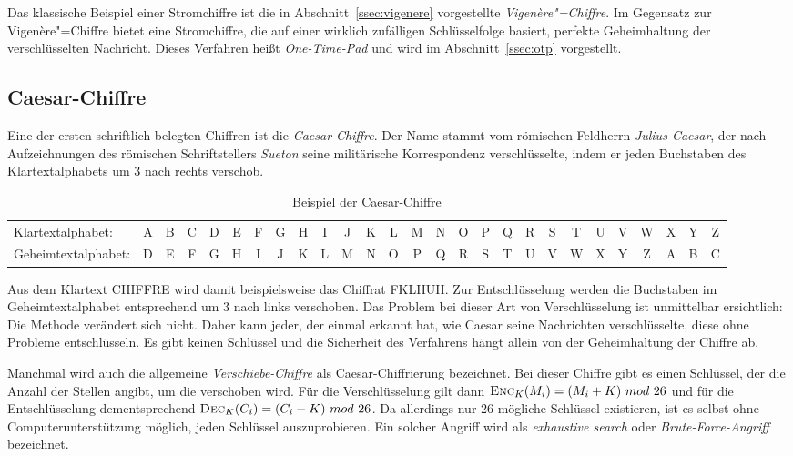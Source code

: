 Das klassische Beispiel einer Stromchiffre ist die in Abschnitt~\ref{ssec:vigenere} vorgestellte \emph{Vigen\`ere"=Chiffre}. Im Gegensatz zur Vigen\`ere"=Chiffre bietet eine Stromchiffre, die auf einer wirklich zufälligen Schlüsselfolge basiert, perfekte Geheimhaltung der verschlüsselten Nachricht. Dieses Verfahren heißt \emph{One-Time-Pad} und wird im Abschnitt~\ref{ssec:otp} vorgestellt.

\subsection{Caesar-Chiffre}
Eine der ersten schriftlich belegten Chiffren ist die \emph{Caesar-Chiffre}. Der Name stammt vom römischen Feldherrn \emph{Julius Caesar}, der nach Aufzeichnungen des römischen Schriftstellers \emph{Sueton} seine militärische Korrespondenz verschlüsselte, indem er jeden Buchstaben des Klartextalphabets um 3 nach rechts verschob.

\begin{table}[h]
	\centering
	\setlength{\tabcolsep}{2pt}
	\begin{tabular}{l*{26}{c}}
		Klartextalphabet: &A&B&C&D&E&F&G&H&I&J&K&L&M&N&O&P&Q&R&S&T&U&V&W&X&Y&Z\\
		Geheimtextalphabet: &D&E&F&G&H&I&J&K&L&M&N&O&P&Q&R&S&T&U&V&W&X&Y&Z&A&B&C\\
	\end{tabular}
	\caption{Beispiel der Caesar-Chiffre}
\end{table}

Aus dem Klartext \glqq CHIFFRE\grqq{} wird damit beispielsweise das Chiffrat \glqq FKLIIUH\grqq. Zur Entschlüsselung werden die Buchstaben im Geheimtextalphabet entsprechend um 3 nach links verschoben. Das Problem bei dieser Art von Verschlüsselung ist unmittelbar ersichtlich: Die Methode verändert sich nicht. Daher kann jeder, der einmal erkannt hat, wie Caesar seine Nachrichten verschlüsselte, diese ohne Probleme entschlüsseln. Es gibt keinen Schlüssel und die Sicherheit des Verfahrens hängt allein von der Geheimhaltung der Chiffre ab.

Manchmal wird auch die allgemeine \emph{Verschiebe-Chiffre} als Caesar-Chiffrierung bezeichnet. Bei dieser Chiffre gibt es einen Schlüssel, der die Anzahl der Stellen angibt, um die verschoben wird. Für die Verschlüsselung gilt dann $\enc_\key(\plaint_i) = (\plaint_i + \key)\ mod\ 26$ und für die Entschlüsselung dementsprechend $\dec_\key(\ciphert_i) = (\ciphert_i - \key)\ mod\ 26$. Da allerdings nur 26 mögliche Schlüssel existieren, ist es selbst ohne Computerunterstützung möglich, jeden Schlüssel auszuprobieren. Ein solcher Angriff wird als \emph{exhaustive search} oder \emph{Brute-Force-Angriff} bezeichnet.

